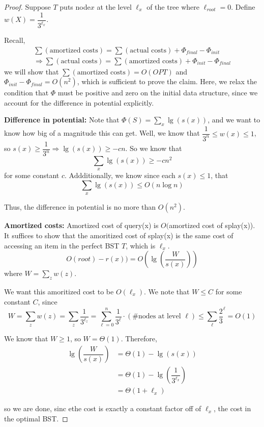 \documentclass[11pt]{article}
\begin{document}
\begin{proof}
Suppose $T$ puts node$x$ at the level $\ell_x$ of the tree where $\ell_{root}=0$. Define $w(X) = \dfrac{1}{3^{\ell_x}}$. 

Recall, \begin{align*}
    \sum(\text{amortized costs}) = \sum(\text{actual costs})+\Phi_{final}-\Phi_{init}\\
    \Rightarrow  \sum(\text{actual costs}) = \sum(\text{amortized costs}) + \Phi_{init} - \Phi_{final}
\end{align*}
we will show that $\sum(\text{amortized costs}) = O(OPT)$ and $\Phi_{init} - \Phi_{final} = O(n^2)$, which is sufficient to prove the claim. Here, we relax the condition that $\Phi$ must be positive and zero on the initial data structure, since we account for the difference in potential explicitly.

\textbf{Difference in potential:} Note that $\Phi(S) = \sum_x \lg (s(x))$, and we want to know how big of a magnitude this can get. Well, we know that $\dfrac{1}{3^n} \le w(x) \le 1$, so $s(x) \ge \dfrac{1}{3^n} \Rightarrow \lg(s(x)) \ge -cn$. So we know that \[\sum_x \lg(s(x)) \ge -cn^2\]
for some constant $c$. Addditionally, we know since each $s(x)\le 1$, that 
\[\sum_x\lg(s(x))\le O(n\log n)\]

Thus, the difference in potential is no more than $O(n^2)$.

\textbf{Amortized costs:} Amortized cost of query(x) is $O($amortized cost of splay(x)). It suffices to show that the amoritized cost of splay(x) is the same cost of accessing an item in the perfect BST $T$, which is $\ell_x$. 
\[O(root) - r(x)) = O\left(\lg\left(\dfrac{W}{s(x)}\right)\right)\]
where $W=\sum_z w(z)$. 

We want this amoritized cost to be $O(\ell_x)$. We note that $W\le C$ for some constant $C$, since \[W = \sum_z w(z) = \sum_z \dfrac{1}{3^{\ell_z}} = \sum_{\ell=0}^n\dfrac{1}{3^\ell}\cdot (\#\text{nodes at level }\ell) \le \sum_{\ell}\dfrac{2}{3}^\ell = O(1)\]

We know that $W\ge 1$, so $W=\Theta(1)$. Therefore,
\begin{align*}
    \lg\left(\dfrac{W}{s(x)}\right) &= \Theta(1) - \lg(s(x))\\
    &= \Theta(1) - \lg\left(\dfrac{1}{3^{\ell_x}}\right)\\
    &= \Theta(1+\ell_x)
\end{align*}

so we are done, sinc ethe cost is exactly a constant factor off of $\ell_x$, the cost in the optimal BST.

\end{proof}
\end{document}
